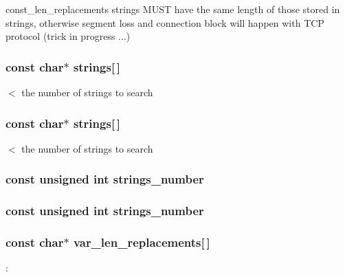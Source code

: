 const\_\-len\_\-replacements strings MUST have the same length of those stored in strings, otherwise segment loss and connection block will happen with TCP protocol (trick in progress ...) \hypertarget{group__Extern__Declarations_ga899c0fa2b3c57dba6154c77de83c8d39}{
\subsubsection[{strings}]{\setlength{\rightskip}{0pt plus 5cm}const char$\ast$ {\bf strings}\mbox{[}$\,$\mbox{]}}}
\label{group__Extern__Declarations_ga899c0fa2b3c57dba6154c77de83c8d39}
$<$ the number of strings to search \hypertarget{group__Extern__Declarations_ga899c0fa2b3c57dba6154c77de83c8d39}{
\subsubsection[{strings}]{\setlength{\rightskip}{0pt plus 5cm}const char$\ast$ {\bf strings}\mbox{[}$\,$\mbox{]}}}
\label{group__Extern__Declarations_ga899c0fa2b3c57dba6154c77de83c8d39}
$<$ the number of strings to search \hypertarget{group__Extern__Declarations_ga2cf154e4b14801b467e37c8f1dcd0aad}{
\subsubsection[{strings\_\-number}]{\setlength{\rightskip}{0pt plus 5cm}const unsigned int {\bf strings\_\-number}}}
\label{group__Extern__Declarations_ga2cf154e4b14801b467e37c8f1dcd0aad}
\hypertarget{group__Extern__Declarations_ga2cf154e4b14801b467e37c8f1dcd0aad}{
\subsubsection[{strings\_\-number}]{\setlength{\rightskip}{0pt plus 5cm}const unsigned int {\bf strings\_\-number}}}
\label{group__Extern__Declarations_ga2cf154e4b14801b467e37c8f1dcd0aad}
\hypertarget{group__Extern__Declarations_ga449ebc7257a18cdb95c138b530539f88}{
\subsubsection[{var\_\-len\_\-replacements}]{\setlength{\rightskip}{0pt plus 5cm}const char$\ast$ {\bf var\_\-len\_\-replacements}\mbox{[}$\,$\mbox{]}}}
\label{group__Extern__Declarations_ga449ebc7257a18cdb95c138b530539f88}
:

